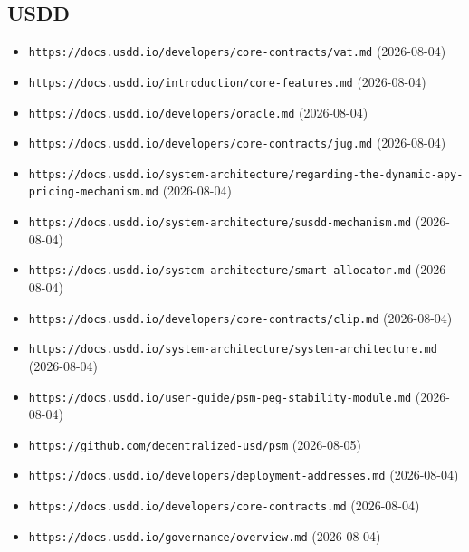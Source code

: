 \subsection*{USDD}
\begin{itemize}\setlength{\itemsep}{0pt}\small
\item \texttt{https://docs.usdd.io/developers/core-contracts/vat.md} (2026-08-04)
\item \texttt{https://docs.usdd.io/introduction/core-features.md} (2026-08-04)
\item \texttt{https://docs.usdd.io/developers/oracle.md} (2026-08-04)
\item \texttt{https://docs.usdd.io/developers/core-contracts/jug.md} (2026-08-04)
\item \texttt{https://docs.usdd.io/system-architecture/regarding-the-dynamic-apy-pricing-mechanism.md} (2026-08-04)
\item \texttt{https://docs.usdd.io/system-architecture/susdd-mechanism.md} (2026-08-04)
\item \texttt{https://docs.usdd.io/system-architecture/smart-allocator.md} (2026-08-04)
\item \texttt{https://docs.usdd.io/developers/core-contracts/clip.md} (2026-08-04)
\item \texttt{https://docs.usdd.io/system-architecture/system-architecture.md} (2026-08-04)
\item \texttt{https://docs.usdd.io/user-guide/psm-peg-stability-module.md} (2026-08-04)
\item \texttt{https://github.com/decentralized-usd/psm} (2026-08-05)
\item \texttt{https://docs.usdd.io/developers/deployment-addresses.md} (2026-08-04)
\item \texttt{https://docs.usdd.io/developers/core-contracts.md} (2026-08-04)
\item \texttt{https://docs.usdd.io/governance/overview.md} (2026-08-04)
\end{itemize}

